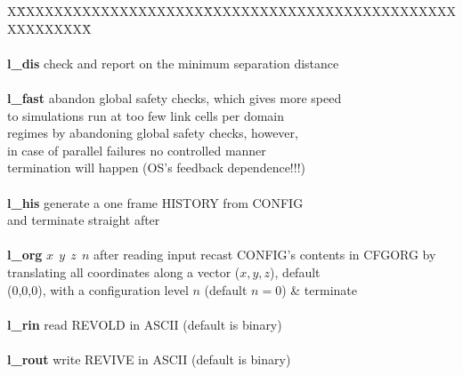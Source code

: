 \begin{tabbing}
X\=XXXXXXXXXXXXXXXXXXXX\=XXXXXXXXXXXXXXXXXXXXXXXXXXXXXXXXXXXX\=\kill
\>                     \> \phantom{xxxxxxxxxxxxxxxxx}  \\
\>                                              \> \\
\> {\bf l\_dis}                                 \> check and report on the minimum separation distance \\
\>                                              \> \\
\> {\bf l\_fast}                                \> abandon global safety checks, which gives more speed \\
\>                                              \> to simulations run at too few link cells per domain \\
\>                                              \> regimes by abandoning global safety checks, however, \\
\>                                              \> in case of parallel failures no controlled manner \\
\>                                              \> termination will happen (OS's feedback dependence!!!) \\
\>                                              \> \\
\> {\bf l\_his}                                 \> generate a one frame HISTORY from CONFIG \\
\>                                              \> and terminate straight after \\
\>                                              \> \\
\> {\bf l\_org} $x~~y~~z~~n$                    \> after reading input recast CONFIG's contents in CFGORG by \\
\>                                              \> translating all coordinates along a vector ($x,y,z$), default \\
\>                                              \> (0,0,0), with a configuration level $n$ (default $n=0$) \& terminate \\
\>                                              \> \\
\> {\bf l\_rin}                                 \> read REVOLD in ASCII (default is binary) \\
\>                                              \> \\
\> {\bf l\_rout}                                \> write REVIVE in ASCII (default is binary) \\

\end{tabbing}

